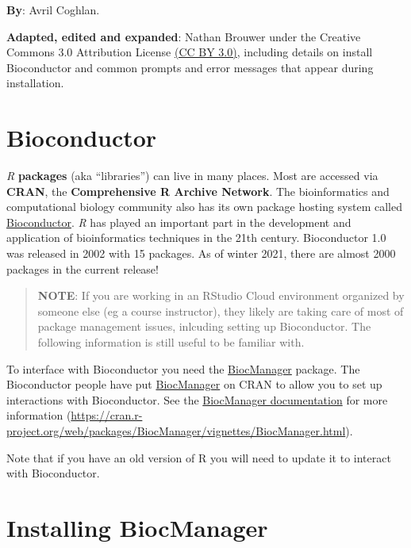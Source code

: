 \documentclass[
]{book}
\begin{document}
\textbf{By}: Avril Coghlan.

\textbf{Adapted, edited and expanded}: Nathan Brouwer under the Creative Commons 3.0 Attribution License \href{https://creativecommons.org/licenses/by/3.0/}{(CC BY 3.0)}, including details on install Bioconductor and common prompts and error messages that appear during installation.

\hypertarget{bioconductor}{%
\section{Bioconductor}\label{bioconductor}}

\emph{R} \textbf{packages} (aka ``libraries'') can live in many places. Most are accessed via \textbf{CRAN}, the \textbf{Comprehensive R Archive Network}. The bioinformatics and computational biology community also has its own package hosting system called \href{www.bioconductor.org}{Bioconductor}. \emph{R} has played an important part in the development and application of bioinformatics techniques in the 21th century. Bioconductor 1.0 was released in 2002 with 15 packages. As of winter 2021, there are almost 2000 packages in the current release!

\begin{quote}
\textbf{NOTE}: If you are working in an RStudio Cloud environment organized by someone else (eg a course instructor), they likely are taking care of most of package management issues, inlcuding setting up Bioconductor. The following information is still useful to be familiar with.
\end{quote}

To interface with Bioconductor you need the \href{https://cran.r-project.org/web/packages/BiocManager/vignettes/BiocManager.html}{BiocManager} package. The Bioconductor people have put \href{https://cran.r-project.org/web/packages/BiocManager/vignettes/BiocManager.html}{BiocManager} on CRAN to allow you to set up interactions with Bioconductor. See the \href{https://cran.r-project.org/web/packages/BiocManager/vignettes/BiocManager.html}{BiocManager documentation} for more information (\url{https://cran.r-project.org/web/packages/BiocManager/vignettes/BiocManager.html}).

Note that if you have an old version of R you will need to update it to interact with Bioconductor.

\hypertarget{installing-biocmanager}{%
\section{Installing BiocManager}\label{installing-biocmanager}}
\end{document}
